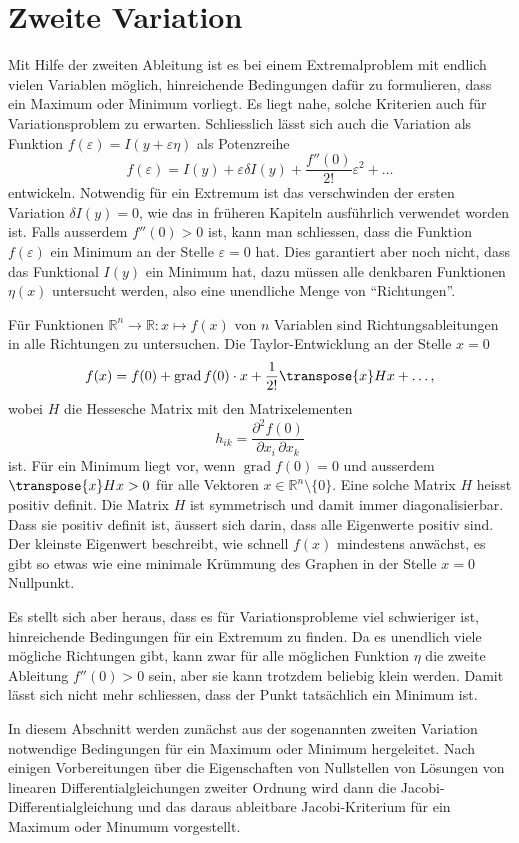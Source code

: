 %
%
%
\chapter{Zweite Variation
\label{buch:chapter:variation2}}
Mit Hilfe der zweiten Ableitung ist es bei einem Extremalproblem
mit endlich vielen Variablen möglich, hinreichende Bedingungen dafür
zu formulieren, dass ein Maximum oder Minimum vorliegt.
Es liegt nahe, solche Kriterien auch für Variationsproblem
zu erwarten.
Schliesslich lässt sich auch die Variation als Funktion
$f(\varepsilon) = I(y+\varepsilon\eta)$ als Potenzreihe
\[
f(\varepsilon)
=
I(y) + \varepsilon \delta I(y) + \frac{f''(0)}{2!}\varepsilon^2 + \dots
\]
entwickeln.
Notwendig für ein Extremum ist das verschwinden der ersten Variation
$\delta I(y)=0$, wie das in früheren Kapiteln ausführlich verwendet
worden ist.
Falls ausserdem $f''(0)>0$ ist, kann man schliessen, dass die
Funktion $f(\varepsilon)$ ein Minimum an der Stelle $\varepsilon=0$
hat.
Dies garantiert aber noch nicht, dass das Funktional $I(y)$
ein Minimum hat, dazu müssen alle denkbaren Funktionen $\eta(x)$
untersucht werden, also eine unendliche Menge von ``Richtungen''.

Für Funktionen $\mathbb{R}^n\to\mathbb{R}: x\mapsto f(x)$ von
$n$ Variablen sind Richtungsableitungen in alle Richtungen zu
untersuchen.
Die Taylor-Entwicklung an der Stelle $x=0$
\[
f(x)
=
f(0)
+
\operatorname{grad}f(0)\cdot x
+
\frac{1}{2!}\transpose{x} H x
+
\dots,
\]
wobei $H$ die Hessesche Matrix mit den Matrixelementen
\[
h_{ik}
=
\frac{\partial^2\! f(0)}{\partial x_i\,\partial x_k}
\]
ist.
Für ein Minimum liegt vor, wenn $\operatorname{grad}f(0)=0$ und ausserdem
$\transpose{x}Hx>0$ für alle Vektoren $x\in\mathbb{R}^n\setminus\{0\}$.
Eine solche Matrix $H$ heisst positiv definit.
Die Matrix $H$ ist symmetrisch und damit immer diagonalisierbar.
Dass sie positiv definit ist, äussert sich darin, dass alle Eigenwerte
positiv sind.
Der kleinste Eigenwert beschreibt, wie schnell $f(x)$ mindestens
anwächst, es gibt so etwas wie eine minimale Krümmung des Graphen
in der Stelle $x=0$ Nullpunkt.

Es stellt sich aber heraus, dass es für Variationsprobleme viel
schwieriger ist, hinreichende Bedingungen für ein Extremum zu finden.
Da es unendlich viele mögliche Richtungen gibt, kann zwar für alle
möglichen Funktion $\eta$ die zweite Ableitung $f''(0)>0$ sein, aber 
sie kann trotzdem beliebig klein werden.
Damit lässt sich nicht mehr schliessen, dass der Punkt tatsächlich
ein Minimum ist.

In diesem Abschnitt werden zunächst aus der sogenannten zweiten
Variation notwendige Bedingungen für ein Maximum oder Minimum
hergeleitet.
Nach einigen Vorbereitungen über die Eigenschaften von Nullstellen
von Lösungen von linearen Differentialgleichungen zweiter Ordnung
wird dann die Jacobi-Differentialgleichung und das daraus ableitbare
Jacobi-Kriterium für ein Maximum oder Minumum vorgestellt.






